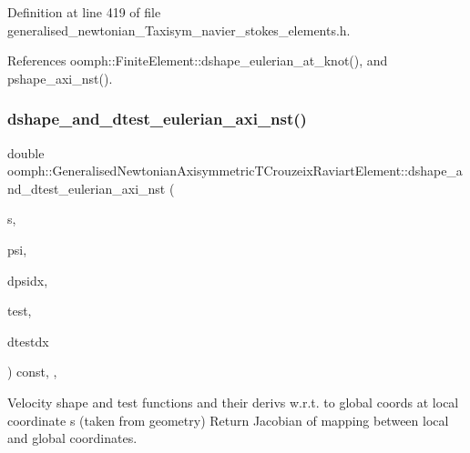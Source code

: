Definition at line 419 of file generalised\+\_\+newtonian\+\_\+\+Taxisym\+\_\+navier\+\_\+stokes\+\_\+elements.\+h.



References oomph\+::\+Finite\+Element\+::dshape\+\_\+eulerian\+\_\+at\+\_\+knot(), and pshape\+\_\+axi\+\_\+nst().

\mbox{\label{classoomph_1_1GeneralisedNewtonianAxisymmetricTCrouzeixRaviartElement_a3f7f83676b97ede469c7d2161f9f5705}} 
\subsubsection{\texorpdfstring{dshape\+\_\+and\+\_\+dtest\+\_\+eulerian\+\_\+axi\+\_\+nst()}{dshape\_and\_dtest\_eulerian\_axi\_nst()}}
{\footnotesize\ttfamily double oomph\+::\+Generalised\+Newtonian\+Axisymmetric\+T\+Crouzeix\+Raviart\+Element\+::dshape\+\_\+and\+\_\+dtest\+\_\+eulerian\+\_\+axi\+\_\+nst (\begin{DoxyParamCaption}\item[{const \hyperlink{classoomph_1_1Vector}{Vector}$<$ double $>$ \&}]{s,  }\item[{\hyperlink{classoomph_1_1Shape}{Shape} \&}]{psi,  }\item[{\hyperlink{classoomph_1_1DShape}{D\+Shape} \&}]{dpsidx,  }\item[{\hyperlink{classoomph_1_1Shape}{Shape} \&}]{test,  }\item[{\hyperlink{classoomph_1_1DShape}{D\+Shape} \&}]{dtestdx }\end{DoxyParamCaption}) const\hspace{0.3cm}{\ttfamily [inline]}, {\ttfamily [protected]}, {\ttfamily [virtual]}}



Velocity shape and test functions and their derivs w.\+r.\+t. to global coords at local coordinate s (taken from geometry) Return Jacobian of mapping between local and global coordinates. 

